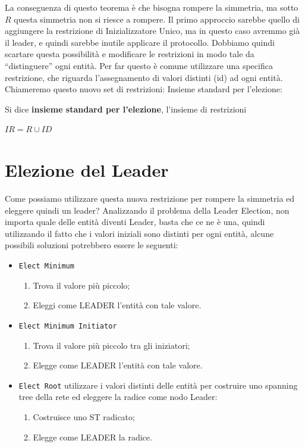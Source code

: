 La conseguenza di questo teorema è che bisogna rompere la simmetria, ma sotto
$R$ questa simmetria non si riesce a rompere. Il primo approccio sarebbe quello di
aggiungere la restrizione di Inizializzatore Unico, ma in questo caso avremmo
già il leader, e quindi sarebbe inutile applicare il protocollo. Dobbiamo quindi
scartare questa possibilità e modificare le restrizioni in modo tale da
``distinguere'' ogni entità. Per far questo è comune utilizzare una specifica
restrizione, che riguarda l'assegnamento di valori distinti (id) ad ogni entità.
Chiameremo questo nuovo set di restrizioni: Insieme standard per l'elezione:

\begin{definition}
    Si dice \textbf{insieme standard per l'elezione}, l'insieme di
    restrizioni
    \begin{center}
        $IR = R \cup {ID}$
    \end{center}
\end{definition}

\section{Elezione del Leader}
Come possiamo utilizzare questa nuova restrizione per rompere la simmetria ed
eleggere quindi un leader? Analizzando il problema della Leader Election, non
importa quale delle entità diventi Leader, basta che ce ne è una, quindi
utilizzando il fatto che i valori iniziali sono distinti per ogni entità, alcune
possibili soluzioni potrebbero essere le seguenti:
\begin{itemize}
    \item \texttt{Elect Minimum}
          \begin{enumerate}
              \item Trova il valore più piccolo;
              \item Eleggi come LEADER l'entità con tale valore.
          \end{enumerate}
    \item \texttt{Elect Minimum Initiator}
          \begin{enumerate}
              \item Trova il valore più piccolo tra gli iniziatori;
              \item Elegge come LEADER l'entità con tale valore.
          \end{enumerate}
    \item \texttt{Elect Root} utilizzare i valori
          distinti delle entità per costruire uno spanning tree della rete ed
          eleggere la radice come nodo Leader:

          \begin{enumerate}
              \item Costruisce uno ST radicato;
              \item Elegge come LEADER la radice.
          \end{enumerate}
\end{itemize}

